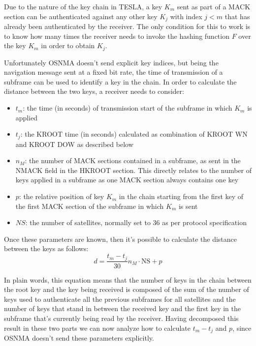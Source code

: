 Due to the nature of the key chain in TESLA, a key $K_m$ sent as part of a MACK
section can be authenticated against any other key $K_j$ with index $j < m$ that
has already been authenticated by the receiver. The only condition for this to
work is to know how many times the receiver needs to invoke the hashing function
$F$ over the key $K_m$ in order to obtain $K_j$.

Unfortunately OSNMA doesn't send explicit key indices, but being the navigation
message sent at a fixed bit rate, the time of transmission of a subframe can
be used to identify a key in the chain. In order to calculate the distance
between the two keys, a receiver needs to consider:
\begin{itemize}
  \item $t_m$: the time (in seconds) of transmission start of the subframe in
    which $K_m$ is applied
  \item $t_j$: the KROOT time (in seconds) calculated as combination of KROOT WN
    and KROOT DOW as described below
  \item $n_M$: the number of MACK sections contained in a subframe, as sent in
    the \textrm{NMACK} field in the HKROOT section. This directly relates to the
    number of keys applied in a subframe as one MACK section always contains one
    key
  \item $p$: the relative position of key $K_m$ in the chain starting from the
    first key of the first MACK section of the subframe in which $K_m$ is sent
  \item $NS$: the number of satellites, normally set to 36 as per protocol
    specification
\end{itemize}
Once these parameters are known, then it's possible to calculate the distance
between the keys as follows:
\begin{equation}
  \label{eq:d}
  d = \frac{t_m - t_j}{30} n_M \cdot \textrm{NS} + p
\end{equation}

In plain words, this equation means that the number of keys in the chain between
the root key and the key being received is composed of the sum of the number of
keys used to authenticate all the previous subframes for all satellites and the
number of keys that stand in between the received key and the first key in the
subframe that's currently being read by the receiver.
Having decomposed this result in these two parts we can now analyze how to
calculate $t_m - t_j$ and $p$, since OSNMA doesn't send these parameters
explicitly.

